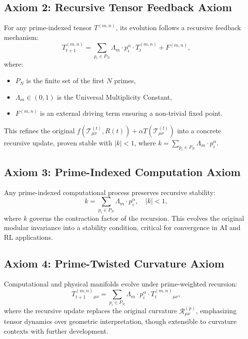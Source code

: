\documentclass{article}
\theoremstyle{plain}
\begin{document}
\subsection{Axiom 2: Recursive Tensor Feedback Axiom}
For any prime-indexed tensor \( T^{(m,n)} \), its evolution follows a recursive feedback mechanism:
\begin{equation}
    T_{t+1}^{(m,n)} = \sum_{p_i \in P_N} \Lambda_m \cdot p_i^\alpha \cdot T_t^{(m,n)} + F^{(m,n)},
\end{equation}
where:
\begin{itemize}
    \item \( P_N \) is the finite set of the first \( N \) primes,
    \item \( \Lambda_m \in (0, 1) \) is the Universal Multiplicity Constant,
    \item \( F^{(m,n)} \) is an external driving term ensuring a non-trivial fixed point.
\end{itemize}
This refines the original \( f(\mathcal{T}_{\mu\nu}^{(t)}, R(t)) + \alpha T(\mathcal{T}_{\mu\nu}^{(t)}) \) into a concrete recursive update, proven stable with \( |k| < 1 \), where \( k = \sum_{p_i \in P_N} \Lambda_m \cdot p_i^\alpha \).

\subsection{Axiom 3: Prime-Indexed Computation Axiom}
Any prime-indexed computational process preserves recursive stability:
\begin{equation}
    k = \sum_{p_i \in P_N} \Lambda_m \cdot p_i^\alpha, \quad |k| < 1,
\end{equation}
where \( k \) governs the contraction factor of the recursion. This evolves the original modular invariance into a stability condition, critical for convergence in AI and RL applications.

\subsection{Axiom 4: Prime-Twisted Curvature Axiom}
Computational and physical manifolds evolve under prime-weighted recursion:
\begin{equation}
    T_{t+1}^{(m,n)}{}_{\mu\nu} = \sum_{p_i \in P_N} \Lambda_m \cdot p_i^\alpha \cdot T_t^{(m,n)}{}_{\mu\nu},
\end{equation}
where the recursive update replaces the original curvature \( \mathcal{R}_{\mu\nu}^{(p)} \), emphasizing tensor dynamics over geometric interpretation, though extensible to curvature contexts with further development.
\end{document}
